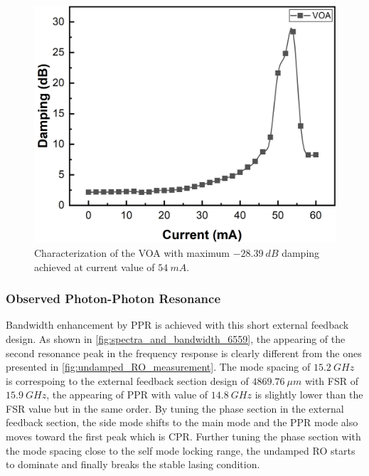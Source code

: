 \begin{figure}[H]
    \centering
    \includegraphics[width=0.6\linewidth]{figures/VOA_18321.png}
    \caption{Characterization of the VOA with maximum $-28.39 \ dB$ damping achieved at current value of $54 \ mA$.}
    \label{fig:VOA_18321}
\end{figure}

\subsubsection{Observed Photon-Photon Resonance} \label{subsubsec:observed_PPR}
Bandwidth enhancement by PPR is achieved with this short external feedback design. As shown in \autoref{fig:spectra_and_bandwidth_6559}, the appearing of the second resonance peak in the frequency response is clearly different from the ones presented in \autoref{fig:undamped_RO_measurement}. The mode spacing of $15.2 \ GHz$ is correspoing to the external feedback section design of $4869.76 \ \mu m$ with FSR of $15.9 \ GHz$, the appearing of PPR with value of $14.8 \ GHz$ is slightly lower than the FSR value but in the same order. By tuning the phase section in the external feedback section, the side mode shifts to the main mode and the PPR mode also moves toward the first peak which is CPR. Further tuning the phase section with the mode spacing close to the self mode locking range, the undamped RO starts to dominate and finally breaks the stable lasing condition.

